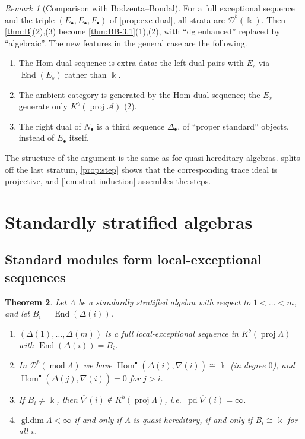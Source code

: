 \documentclass[11pt,reqno]{amsart}
\theoremstyle{plain}
\newtheorem{theorem}{Theorem}[section]
\theoremstyle{definition}
\theoremstyle{remark}
\newtheorem{remark}[theorem]{Remark}
\newcommand{\kk}{\Bbbk}
\DeclareMathOperator{\Hom}{Hom}
\DeclareMathOperator{\End}{End}
\DeclareMathOperator{\gldim}{gl.dim}
\DeclareMathOperator{\pd}{pd}
\newcommand{\modd}{\operatorname{mod}}
\newcommand{\proj}{\operatorname{proj}}
\newcommand{\Db}{\mathcal{D}^b}
\newcommand{\Kb}{K^b}
\newcommand{\nablabar}{\overline{\nabla}}
\newcommand{\Deltabar}{\overline{\Delta}}
\newcommand{\cA}{\mathcal{A}}
\begin{document}
\begin{remark}[Comparison with Bodzenta--Bondal]\label{rem:B-vs-BB}
For a full exceptional sequence and the triple $(E_\bullet,E_\bullet,F_\bullet)$ of \cref{prop:exc-dual}, all strata are $\Db(\kk)$. Then \cref{thm:B}(2),(3) become \cref{thm:BB-3.1}(1),(2), with ``dg enhanced'' replaced by ``algebraic''. The new features in the general case are the following.
\begin{enumerate}
\item The Hom-dual sequence is extra data: the left dual pairs with $E_s$ via $\End(E_s)$ rather than $\kk$.
\item The ambient category is generated by the Hom-dual sequence; the $E_s$ generate only $\Kb(\proj\cA)$ (\cref{thm:C}).
\item The right dual of $N_\bullet$ is a third sequence $\Deltabar_\bullet$, of ``proper standard'' objects, instead of $E_\bullet$ itself.
\end{enumerate}
The structure of the argument is the same as for quasi-hereditary algebras.  splits off the last stratum, \cref{prop:step} shows that the corresponding trace ideal is projective, and \cref{lem:strat-induction} assembles the steps.
\end{remark}


\section{Standardly stratified algebras}\label{sec:stratified}

\subsection{Standard modules form local-exceptional sequences}

\begin{theorem}\label{thm:C}
Let $\Lambda$ be a standardly stratified algebra with respect to $1<\dots<m$, and let $B_i=\End(\Delta(i))$.
\begin{enumerate}
\item $(\Delta(1),\dots,\Delta(m))$ is a full local-exceptional sequence in $\Kb(\proj\Lambda)$ with $\End(\Delta(i))=B_i$.
\item In $\Db(\modd\Lambda)$ we have $\Hom^\bullet(\Delta(i),\nablabar(i))\cong\kk$ (in degree $0$), and $\Hom^\bullet(\Delta(j),\nablabar(i))=0$ for $j>i$.
\item If $B_i\ne\kk$, then $\nablabar(i)\notin\Kb(\proj\Lambda)$, i.e.\ $\pd\nablabar(i)=\infty$.
\item $\gldim\Lambda<\infty$ if and only if $\Lambda$ is quasi-hereditary, if and only if $B_i\cong\kk$ for all $i$.
\end{enumerate}
\end{theorem}
\end{document}
